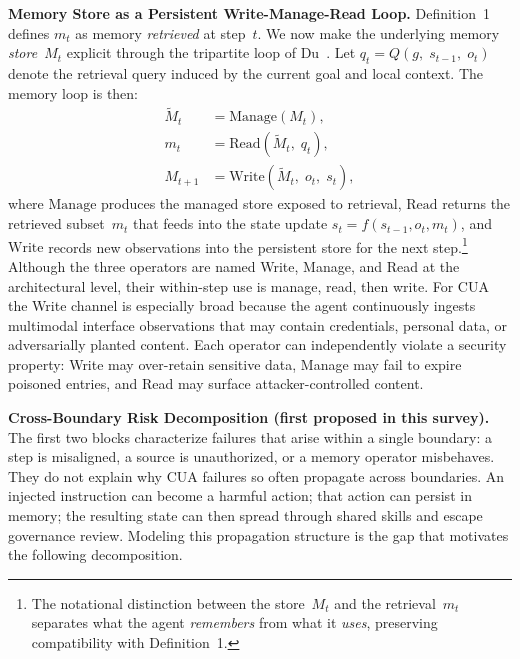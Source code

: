 \smallskip
\noindent\textbf{Memory Store as a Persistent Write-Manage-Read Loop.}
Definition~1 defines $m_t$ as memory \emph{retrieved} at step~$t$. We now make the underlying memory \emph{store}~$M_t$ explicit through the tripartite loop of Du~\cite{memorysurveycua2026}. Let $q_t = Q(g,\; s_{t-1},\; o_t)$ denote the retrieval query induced by the current goal and local context. The memory loop is then:
\begin{align}
  \widetilde{M}_t &= \mathrm{Manage}(M_t), \label{eq:mem-manage} \\
  m_t &= \mathrm{Read}(\widetilde{M}_t,\; q_t), \label{eq:mem-read} \\
  M_{t+1} &= \mathrm{Write}(\widetilde{M}_t,\; o_t,\; s_t), \label{eq:mem-write}
\end{align}
where $\mathrm{Manage}$ produces the managed store exposed to retrieval, $\mathrm{Read}$ returns the retrieved subset~$m_t$ that feeds into the state update $s_t = f(s_{t-1}, o_t, m_t)$, and $\mathrm{Write}$ records new observations into the persistent store for the next step.\footnote{The notational distinction between the store~$M_t$ and the retrieval~$m_t$ separates what the agent \emph{remembers} from what it \emph{uses}, preserving compatibility with Definition~1.} Although the three operators are named Write, Manage, and Read at the architectural level, their within-step use is manage, read, then write. For CUA the Write channel is especially broad because the agent continuously ingests multimodal interface observations that may contain credentials, personal data, or adversarially planted content. Each operator can independently violate a security property: Write may over-retain sensitive data, Manage may fail to expire poisoned entries, and Read may surface attacker-controlled content.

\smallskip
\noindent\textbf{Cross-Boundary Risk Decomposition (first proposed in this survey).}
The first two blocks characterize failures that arise within a single boundary: a step is misaligned, a source is unauthorized, or a memory operator misbehaves. They do not explain why CUA failures so often propagate across boundaries. An injected instruction can become a harmful action; that action can persist in memory; the resulting state can then spread through shared skills and escape governance review. Modeling this propagation structure is the gap that motivates the following decomposition.

